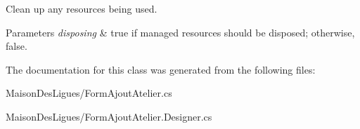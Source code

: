 Clean up any resources being used. 


\begin{DoxyParams}{Parameters}
{\em disposing} & true if managed resources should be disposed; otherwise, false.\\
\hline
\end{DoxyParams}


The documentation for this class was generated from the following files\+:\begin{DoxyCompactItemize}
\item 
Maison\+Des\+Ligues/Form\+Ajout\+Atelier.\+cs\item 
Maison\+Des\+Ligues/Form\+Ajout\+Atelier.\+Designer.\+cs\end{DoxyCompactItemize}

